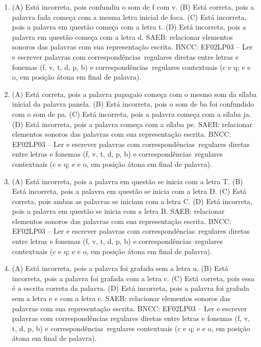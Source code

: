 \begin{enumerate}
\item
(A) Está incorreta, pois confundiu o som de f com v.
(B) Está correta, pois a palavra fada começa com a mesma letra inicial de foca.
(C) Está incorreta, pois a palavra em questão começa com a letra t.
(D) Está incorreta, pois a palavra em questão começa com a letra d.
SAEB: relacionar elementos sonoros das palavras com sua representação escrita.
BNCC: EF02LP03 -- Ler e escrever palavras com correspondências~regulares
diretas entre letras e fonemas (f, v, t, d, p, b) e correspondências~regulares contextuais (c e q; e e o, em posição átona em final de palavra).

\item
(A) Está correta, pois a palavra papagaio começa com o mesmo som da
sílaba inicial da palavra panela.
(B) Está incorreta, pois o som de ba foi confundido com o som de pa.
(C) Está incorreta, pois a palavra começa com a sílaba ja.
(D) Está incorreta, pois a palavra começa com a sílaba pe.
SAEB: relacionar elementos sonoros das palavras com sua representação escrita.
BNCC: EF02LP03 -- Ler e escrever palavras com correspondências~regulares
diretas entre letras e fonemas (f, v, t, d, p, b) e correspondências~regulares contextuais (c e q; e e o, em posição átona em final de palavra).

\item
(A) Está incorreta, pois a palavra em questão se inicia com a letra T.
(B) Está incorreta, pois a palavra em questão se inicia com a letra D.
(C) Está correta, pois ambas as palavras se iniciam com a letra C.
(D) Está incorreta, pois a palavra em questão se inicia com a letra B.
SAEB: relacionar elementos sonoros das palavras com sua representação escrita.
BNCC: EF02LP03 -- Ler e escrever palavras com correspondências~regulares diretas entre letras e fonemas (f, v, t, d, p, b) e correspondências~regulares contextuais (c e q; e e o, em posição átona em final de palavra).

\item
(A) Está incorreta, pois a palavra foi grafada sem a letra u.
(B) Está incorreta, pois a palavra foi grafada com a letra c.
(C) Está correta, pois essa é a escrita correta da palavra.
(D) Está incorreta, pois a palavra foi grafada sem a letra e e com a letra c.
SAEB: relacionar elementos sonoros das palavras com sua representação escrita.
BNCC: EF02LP03 -- Ler e escrever palavras com correspondências regulares diretas entre letras e fonemas (f, v, t, d, p, b) e correspondências~regulares contextuais (c e q; e e o, em posição átona em final de palavra).


\end{enumerate}
